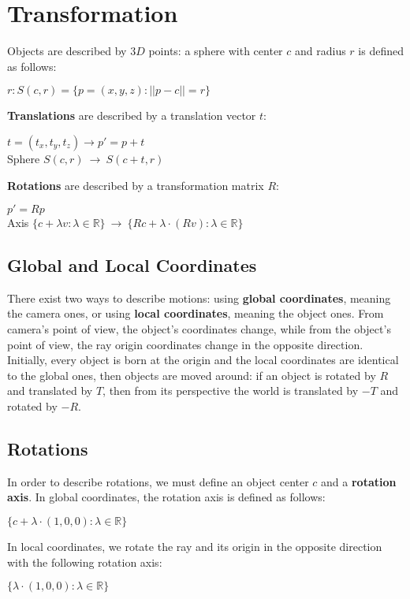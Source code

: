 \documentclass{article}
\begin{document}
\section{Transformation}
Objects are described by $3D$ points: a sphere with center $c$ and radius $r$ is defined as follows:
\begin{center}
    $r : S(c,r) = \{p = (x,y,z) : ||p-c|| = r\} $
\end{center}
\textbf{Translations} are described by a translation vector $t$:
\begin{center}
    $t = (t_x, t_y, t_z) \rightarrow p' = p + t$ \\
    \vspace{0.2cm}
    Sphere $S(c, r) \ \rightarrow \ S(c + t, r)$
\end{center}
\textbf{Rotations} are described by a transformation matrix $R$:
\begin{center}
    $p' = Rp$ \\
    \vspace{0.2cm}
    Axis $\{c + \lambda v : \lambda \in \mathbb{R}\} \ \rightarrow \ \{Rc + \lambda \cdot (Rv) : \lambda \in \mathbb{R}\}$
\end{center}
\subsection{Global and Local Coordinates}
There exist two ways to describe motions: using \textbf{global coordinates}, meaning the camera ones, or using \textbf{local coordinates}, meaning the object ones. From camera’s point of view, the object's coordinates change, while from the object's point of view, the ray origin coordinates change in the opposite direction. \\
Initially, every object is born at the origin and the local coordinates are identical to the global ones, then objects are moved around: if an object is rotated by $R$ and translated by $T$, then from its perspective the world is translated by $-T$ and rotated by $-R$.
\subsection{Rotations}
In order to describe rotations, we must define an object center $c$ and a \textbf{rotation axis}. In global coordinates, the rotation axis is defined as follows:
\begin{center}
    $\{c + \lambda\cdot (1,0,0):\lambda\in\mathbb{R}\}$
\end{center}
In local coordinates, we rotate the ray and its origin in the opposite direction with the following rotation axis:
\begin{center}
    $\{\lambda\cdot(1,0,0):\lambda\in\mathbb{R}\}$
\end{center}
\end{document}
